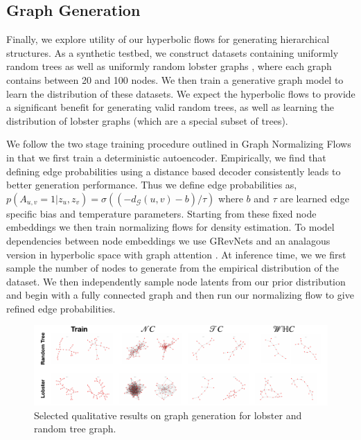 \subsection{Graph Generation}

Finally, we explore utility of our hyperbolic flows for generating hierarchical structures. 
As a synthetic testbed, we construct datasets containing uniformly random trees as well as uniformly random lobster graphs \cite{golomb1996polyominoes}, where each graph contains between 20 and 100 nodes. 
We then train a generative graph model to learn the distribution of these datasets. 
We expect the hyperbolic flows to provide a significant benefit for generating valid random trees, as well as learning the distribution of lobster graphs (which are a special subset of trees). 

We follow the two stage training procedure outlined in Graph Normalizing Flows \cite{liu2019graph} in that we first train a deterministic autoencoder. Empirically, we find that defining edge probabilities using a distance based decoder consistently leads to better generation performance. Thus we define edge probabilities as, $p(A_{u,v}=1|z_u,z_v) = \sigma((-d_{\mathcal{G}}(u,v) - b)/\tau)$ where $b$ and $\tau$ are learned edge specific bias and temperature parameters. Starting from these fixed node embeddings we then train normalizing flows for density estimation. To model dependencies between node embeddings we use GRevNets \cite{liu2019graph} and an analagous version in hyperbolic space with graph attention \cite{velivckovic2017graph}. At inference time, we we first sample the number of nodes to generate from the empirical distribution of the dataset. We then independently sample node latents from our prior distribution and begin with a fully connected graph and then run our normalizing flow to give refined edge probabilities. 

\begin{figure}
    \centering
    \includegraphics[width=\textwidth]{hyperbolic_graph_gen.pdf}
    \vspace{-5mm}
    \caption{Selected qualitative results on graph generation for lobster and random tree graph.}
    \label{fig:graph_generation_pic}
\end{figure}

